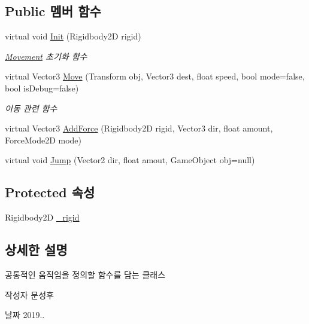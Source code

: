 \subsection*{Public 멤버 함수}
\begin{DoxyCompactItemize}
\item 
virtual void \mbox{\hyperlink{class_movement_a1c50c07edbe274e1cf55253e87506684}{Init}} (Rigidbody2D rigid)
\begin{DoxyCompactList}\small\item\em \mbox{\hyperlink{class_movement}{Movement}} 초기화 함수 \end{DoxyCompactList}\item 
virtual Vector3 \mbox{\hyperlink{class_movement_ad400f155e0556a5e22a74cb77858460a}{Move}} (Transform obj, Vector3 dest, float speed, bool mode=false, bool is\+Debug=false)
\begin{DoxyCompactList}\small\item\em 이동 관련 함수 \end{DoxyCompactList}\item 
virtual Vector3 \mbox{\hyperlink{class_movement_ab0b20a2f058e2eed15f4bdf0503a2566}{Add\+Force}} (Rigidbody2D rigid, Vector3 dir, float amount, Force\+Mode2D mode)
\item 
virtual void \mbox{\hyperlink{class_movement_a561e8f643a3f3cd6b0b6789c72161e98}{Jump}} (Vector2 dir, float amout, Game\+Object obj=null)
\end{DoxyCompactItemize}
\subsection*{Protected 속성}
\begin{DoxyCompactItemize}
\item 
Rigidbody2D \mbox{\hyperlink{class_movement_a8b24a93b5f529e53c668ff81bde13c0d}{\+\_\+rigid}}
\end{DoxyCompactItemize}


\subsection{상세한 설명}
공통적인 움직임을 정의할 함수를 담는 클래스 

\begin{DoxyAuthor}{작성자}
문성후 
\end{DoxyAuthor}
\begin{DoxyDate}{날짜}
2019.. 
\end{DoxyDate}


